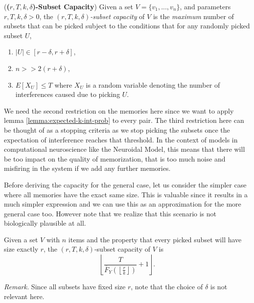     \begin{definition} (\textbf{(\textit{$r,T,k,\delta$})-Subset Capacity}) Given a set $V = \{v_1,...,v_n\}$, and parameters $r, T, k, \delta > 0$, the \textit{$(r,T,k,\delta)$-subset capacity} of $V$ is the \textit{maximum} number of subsets that can be picked subject to the conditions that for any randomly picked subset $U$,
        \begin{enumerate}
            \item $|U| \in [r-\delta,r+\delta]$,
            \item $n >> 2(r+\delta)$,
            \item \label{equ:cap-bound-expected}$E[X_U] \le T$ where $X_U$ is a random variable denoting the number of interferences caused due to picking $U$. 
        \end{enumerate}
    \end{definition}

    We need the second restriction on the memories here since we want to apply lemma \ref{lemma:expected-k-int-prob} to every pair. The third restriction here can be thought of as a stopping criteria as we stop picking the subsets once the expectation of interference reaches that threshold. In the context of models in computational neuroscience like the Neuroidal Model, this means that there will be too impact on the quality of memorization, that is too much noise and misfiring in the system if we add any further memories.
    
    Before deriving the capacity for the general case, let us consider the simpler case where all memories have the exact same size. This is valuable since it results in a much simpler expression and we can use this as an approximation for the more general case too. However note that we realize that this scenario is not biologically plausible at all. 

    \begin{theorem}
        \label{thm:exact-r}
        Given a set $V$ with $n$ items and the property that every picked subset will have size exactly $r$, the $(r,T,k,\delta)$-subset capacity of $V$ is 
        \begin{equation*}
            \left\lfloor \frac{T}{\bar{F}_Y\left(\left\lfloor \frac{r}{k} \right\rfloor\right)} + 1 \right\rfloor.
        \end{equation*}
    \end{theorem}

    \textit{Remark.} Since all subsets have fixed size $r$, note that the choice of $\delta$ is not relevant here.

